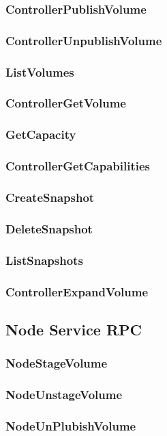 \documentclass[12pt]{article}
\begin{document}
\subsubsection{ControllerPublishVolume}
\subsubsection{ControllerUnpublishVolume}
\subsubsection{ListVolumes}
\subsubsection{ControllerGetVolume}
\subsubsection{GetCapacity}
\subsubsection{ControllerGetCapabilities}
\subsubsection{CreateSnapshot}
\subsubsection{DeleteSnapshot}
\subsubsection{ListSnapshots}
\subsubsection{ControllerExpandVolume}

\subsection{Node Service RPC}
\subsubsection{NodeStageVolume}
\subsubsection{NodeUnstageVolume}
\subsubsection{NodeUnPlubishVolume}
\end{document}
